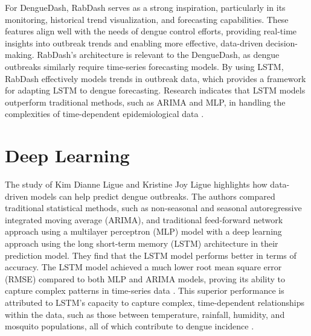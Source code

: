 For DengueDash, RabDash serves as a strong inspiration, particularly in its monitoring, historical trend visualization, and forecasting capabilities. These features align well with the needs of dengue control efforts, providing real-time insights into outbreak trends and enabling more effective, data-driven decision-making. RabDash’s architecture is relevant to the DengueDash, as dengue outbreaks similarly require time-series forecasting models. By using LSTM, RabDash effectively models trends in outbreak data, which provides a framework for adapting LSTM to dengue forecasting. Research indicates that LSTM models outperform traditional methods, such as ARIMA and MLP, in handling the complexities of time-dependent epidemiological data \cite{ligue2022deep}.


\section{Deep Learning}
The study of Kim Dianne Ligue and Kristine Joy Ligue highlights how data-driven models can help predict dengue outbreaks. The authors compared traditional statistical methods, such as non-seasonal and seasonal autoregressive integrated moving average (ARIMA), and traditional feed-forward network approach using a multilayer perceptron (MLP) model with a deep learning approach using the long short-term memory (LSTM) architecture in their prediction model. They find that the LSTM model performs better in terms of accuracy. The LSTM model achieved a much lower root mean square error (RMSE) compared to both MLP and ARIMA models, proving its ability to capture complex patterns in time-series data \cite{ligue2022deep}. This superior performance is attributed to LSTM’s capacity to capture complex, time-dependent relationships within the data, such as those between temperature, rainfall, humidity, and mosquito populations, all of which contribute to dengue incidence \cite{ligue2022deep}.

